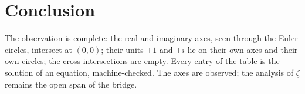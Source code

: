 \documentclass[sigplan,10pt,anonymous,review]{acmart}
\begin{document}
\section{Conclusion}

The observation is complete: the real and imaginary axes, seen through
the Euler circles, intersect at $(0,0)$; their units $\pm 1$ and $\pm i$
lie on their own axes and their own circles; the cross-intersections are
empty. Every entry of the table is the solution of an equation,
machine-checked. The axes are observed; the analysis of $\zeta$ remains
the open span of the bridge.



\end{document}
